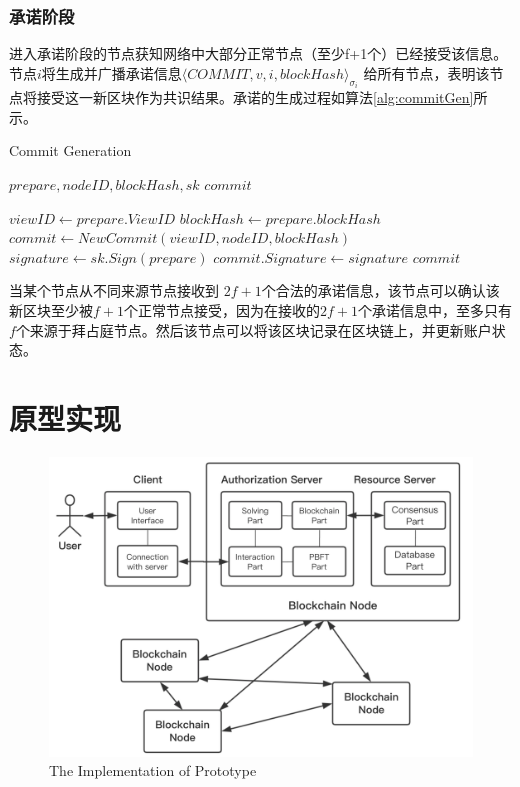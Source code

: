 \subsubsection{承诺阶段}

进入承诺阶段的节点获知网络中大部分正常节点（至少f+1个）已经接受该信息。节点$i$将生成并广播承诺信息$\langle COMMIT, v, i, blockHash \rangle_{\sigma_{i}}$ 给所有节点，表明该节点将接受这一新区块作为共识结果。承诺的生成过程如算法\ref{alg:commitGen}所示。

 \begin{algorithm}
 \caption{Commit Generation}
   \begin{algorithmic}[H]\label{alg:commitGen}
   \renewcommand{\algorithmicrequire}{\textbf{Input:}}
   \renewcommand{\algorithmicensure}{\textbf{Output:}}
   \REQUIRE $prepare, nodeID, blockHash, sk$
   \ENSURE  $commit$

    \STATE $viewID \gets prepare.ViewID$
    \STATE $blockHash \gets prepare.blockHash$
    \STATE $commit \gets NewCommit(viewID, nodeID, blockHash)$
    \STATE $signature \gets sk.Sign(prepare)$
    \STATE $commit.Signature \gets signature$
   \RETURN $commit$
   \end{algorithmic}
 \end{algorithm}

当某个节点从不同来源节点接收到 $2f+1$个合法的承诺信息，该节点可以确认该新区块至少被$f+1$个正常节点接受，因为在接收的$2f+1$个承诺信息中，至多只有$f$个来源于拜占庭节点。然后该节点可以将该区块记录在区块链上，并更新账户状态。

\section{原型实现}

\begin{figure}
\centering
\includegraphics[width=12cm, keepaspectratio]{figures/implementation.png}
\caption{The Implementation of Prototype}
\label{fig:implementation}
\end{figure}

